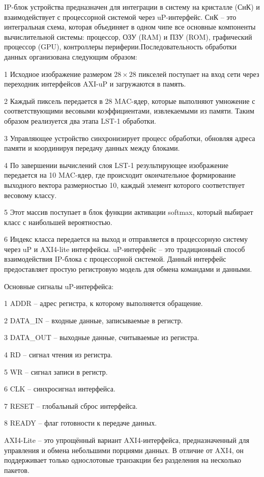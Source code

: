 IP-блок устройства предназначен для интеграции в систему на кристалле (СнК) и 
взаимодействует с процессорной системой через uP-интерфейс. СнК – это 
интегральная схема, которая объединяет в одном чипе все основные компоненты
вычислительной системы: процессор, ОЗУ (RAM) и ПЗУ (ROM), графический процессор
(GPU), контроллеры периферии.Последовательность обработки данных организована 
следующим образом:

  1 Исходное изображение размером $28 \times 28$ пикселей поступает на вход 
сети через переходник интерфейсов AXI-uP и загружаются в память.

  2 Каждый пиксель передается в 28 MAC-ядер, которые выполняют умножение с 
соответствующими весовыми коэффициентами, извлекаемыми из памяти. Таким 
образом реализуется два этапа LST-1 обработки.

  3 Управляющее устройство синхронизирует процесс обработки, обновляя адреса 
памяти и координируя передачу данных между блоками.

  4 По завершении вычислений слоя LST-1 результирующее изображение передается 
на 10 MAC-ядер, где происходит окончательное формирование выходного вектора 
размерностью 10, каждый элемент которого соответствует весовому классу.

  5 Этот массив поступает в блок функции активации softmax, который выбирает 
класс с наибольшей вероятностью.

  6 Индекс класса передается на выход и отправляется в процессорную систему 
через uP и AXI4-lite интерфейсы. uP-интерфейс – это традиционный способ 
взаимодействия IP-блока с процессорной системой. Данный интерфейс 
предоставляет простую регистровую модель для обмена командами и 
данными\cite{chu_fpga}.

Основные сигналы uP-интерфейса:

  1 {ADDR} – адрес регистра, к которому выполняется обращение.

  2 {DATA\_IN} – входные данные, записываемые в регистр.

  3 {DATA\_OUT} – выходные данные, считываемые из регистра.

  4 {RD} – сигнал чтения из регистра.

  5 {WR} – сигнал записи в регистр.

  6 {CLK} – синхросигнал интерфейса.

  7 {RESET} – глобальный сброс интерфейса.

  8 {READY} – флаг готовности к передаче данных.

AXI4-Lite – это упрощённый вариант AXI4-интерфейса, предназначенный для 
управления и обмена небольшими порциями данных. В отличие от AXI4, он 
поддерживает только однослотовые транзакции без разделения на несколько 
пакетов\cite{vivado_axi}.

